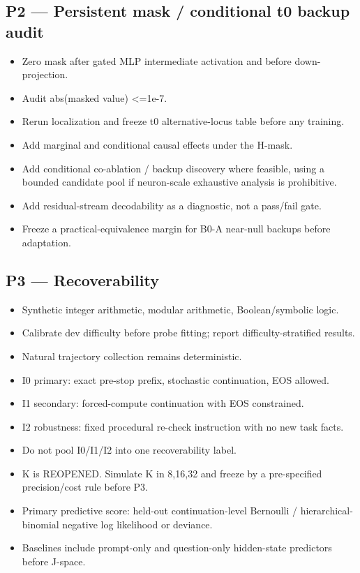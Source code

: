 \subsection{P2 --- Persistent mask / conditional t0 backup audit}\label{p2-persistent-mask-t0}

\begin{itemize}
\tightlist
\item Zero mask after gated MLP intermediate activation and before down-projection.
\item Audit abs(masked value) <=1e-7.
\item Rerun localization and freeze t0 alternative-locus table before any training.
\item Add marginal and conditional causal effects under the H-mask.
\item Add conditional co-ablation / backup discovery where feasible, using a bounded candidate pool if neuron-scale exhaustive analysis is prohibitive.
\item Add residual-stream decodability as a diagnostic, not a pass/fail gate.
\item Freeze a practical-equivalence margin for B0-A near-null backups before adaptation.
\end{itemize}

\subsection{P3 --- Recoverability}\label{p3-recoverability}

\begin{itemize}
\tightlist
\item Synthetic integer arithmetic, modular arithmetic, Boolean/symbolic logic.
\item Calibrate dev difficulty before probe fitting; report difficulty-stratified results.
\item Natural trajectory collection remains deterministic.
\item I0 primary: exact pre-stop prefix, stochastic continuation, EOS allowed.
\item I1 secondary: forced-compute continuation with EOS constrained.
\item I2 robustness: fixed procedural re-check instruction with no new task facts.
\item Do not pool I0/I1/I2 into one recoverability label.
\item K is REOPENED. Simulate K in {8,16,32} and freeze by a pre-specified precision/cost rule before P3.
\item Primary predictive score: held-out continuation-level Bernoulli / hierarchical-binomial negative log likelihood or deviance.
\item Baselines include prompt-only and question-only hidden-state predictors before J-space.
\end{itemize}

